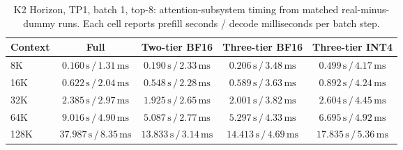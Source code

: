 \begin{table}[t]
\centering
\small
\caption{K2 Horizon, TP1, batch 1, top-8: attention-subsystem timing from matched real-minus-dummy runs. Each cell reports prefill seconds / decode milliseconds per batch step.}
\label{tab:prolong-k2-horizon-tp1-b1-attention-core}
\begin{tabular}{lcccc}
\toprule
Context & Full & Two-tier BF16 & Three-tier BF16 & Three-tier INT4 \\
\midrule
8K & \(0.160\,\mathrm{s}\,/\,1.31\,\mathrm{ms}\) & \(0.190\,\mathrm{s}\,/\,2.33\,\mathrm{ms}\) & \(0.206\,\mathrm{s}\,/\,3.48\,\mathrm{ms}\) & \(0.499\,\mathrm{s}\,/\,4.17\,\mathrm{ms}\) \\
16K & \(0.622\,\mathrm{s}\,/\,2.04\,\mathrm{ms}\) & \(0.548\,\mathrm{s}\,/\,2.28\,\mathrm{ms}\) & \(0.589\,\mathrm{s}\,/\,3.63\,\mathrm{ms}\) & \(0.892\,\mathrm{s}\,/\,4.24\,\mathrm{ms}\) \\
32K & \(2.385\,\mathrm{s}\,/\,2.97\,\mathrm{ms}\) & \(1.925\,\mathrm{s}\,/\,2.65\,\mathrm{ms}\) & \(2.001\,\mathrm{s}\,/\,3.82\,\mathrm{ms}\) & \(2.604\,\mathrm{s}\,/\,4.45\,\mathrm{ms}\) \\
64K & \(9.016\,\mathrm{s}\,/\,4.90\,\mathrm{ms}\) & \(5.087\,\mathrm{s}\,/\,2.77\,\mathrm{ms}\) & \(5.297\,\mathrm{s}\,/\,4.33\,\mathrm{ms}\) & \(6.695\,\mathrm{s}\,/\,4.92\,\mathrm{ms}\) \\
128K & \(37.987\,\mathrm{s}\,/\,8.35\,\mathrm{ms}\) & \(13.833\,\mathrm{s}\,/\,3.14\,\mathrm{ms}\) & \(14.413\,\mathrm{s}\,/\,4.69\,\mathrm{ms}\) & \(17.835\,\mathrm{s}\,/\,5.36\,\mathrm{ms}\) \\
\bottomrule
\end{tabular}
\end{table}

